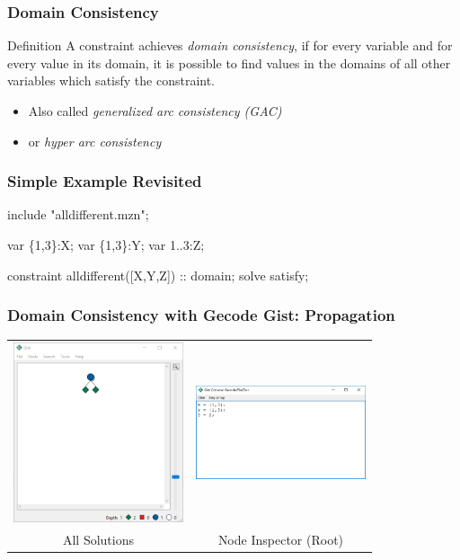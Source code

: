 \begin{frame}
\frametitle{Domain Consistency}
\begin{block}{Definition}
A constraint achieves {\em domain consistency}, if for every variable and for every value in its domain, it is possible to find values in the domains of all other variables which satisfy the constraint.
\end{block}
\begin{itemize}
\item Also called {\em generalized arc consistency (GAC)}
\item or {\em hyper arc consistency}
\end{itemize}
\end{frame}

\begin{frame}[fragile]
\frametitle{Simple Example Revisited}
\begin{semiverbatim}
include "alldifferent.mzn";

var \{1,3\}:X; %
var \{1,3\}:Y;
var 1..3:Z; %

constraint alldifferent([X,Y,Z]) :: domain;
solve satisfy;
\end{semiverbatim}
\end{frame}

\begin{frame}
  \frametitle{Domain Consistency with Gecode Gist: Propagation}
  \begin{tabular}{cc}
    \includegraphics[width=5cm]{../sudoku/images/xyzgistdomain}
    &
    \includegraphics[width=5cm]{../sudoku/images/xyzgistdomaininspector}
    \\
    All Solutions & Node Inspector (Root)
  \end{tabular}
\end{frame}


